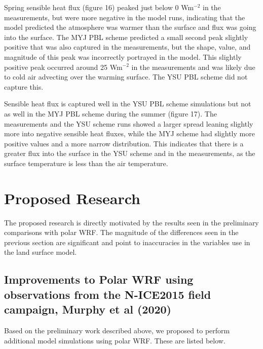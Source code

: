 Spring sensible heat flux (figure 16) peaked just below 0 Wm$^{-2}$ in the measurements, but were more negative in the model runs, indicating that the model predicted the atmosphere was warmer than the surface and flux was going into the surface. The MYJ PBL scheme predicted a small second peak slightly positive that was also captured in the measurements, but the shape, value, and magnitude of this peak was incorrectly portrayed in the model. This slightly positive peak occurred around 25 Wm$^{-2}$   in the measurements and was likely due to cold air advecting over the warming surface. The YSU PBL scheme did not capture this.

Sensible heat flux is captured well in the YSU PBL scheme simulations but not as well in the MYJ PBL scheme during the summer (figure 17). The measurements and the YSU scheme runs showed a larger spread leaning slightly more into negative sensible heat fluxes, while the MYJ scheme had slightly more positive values and a more narrow distribution. This indicates that there is a greater flux into the surface in the YSU scheme and in the measurements, as the surface temperature is less than the air temperature.

\section{Proposed Research}

The proposed research is directly motivated by the results seen in the preliminary comparisons with polar WRF. The magnitude of the differences seen in the previous section are significant and point to inaccuracies in the variables use in the land surface model. 

\subsection{Improvements to Polar WRF using observations from the N-ICE2015 field campaign, Murphy et al (2020)}

Based on the preliminary work described above, we proposed to perform additional model simulations using polar WRF. These are listed below.


